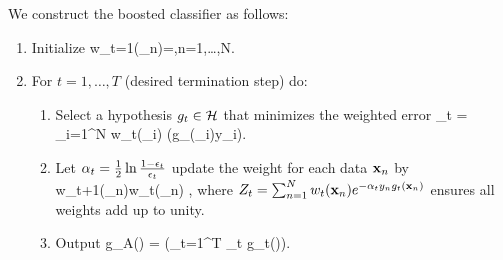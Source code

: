 We construct the boosted classifier as follows:
\begin{enumerate}
	\item Initialize
	\bse 
	w_{t=1}(\mx_n)=,\quad n=1,\dots,N.
	\ese 
	\item For $t=1,\dots, T$ (desired termination step) do:
	\begin{enumerate}
		\item Select a hypothesis $g_t \in \mathcal{H}$ that minimizes the weighted error 
		\be
		\epsilon_t = \sum_{i=1}^N w_t(\mx_i) \mI(g_(\mx_i)\neq y_i).
		\ee 
		\item Let $\alpha_t = \frac{1}{2} \ln \frac{1-\epsilon_t}{\epsilon_t}$ update the weight for each data $\mathbf{x}_n$ by 
		\bse 
		w_{t+1}(\mx_n)\leftarrow w_t(\mx_n) ,
		\ese 
		where $Z_t=\sum_{n=1}^N w_t(\mathbf{x}_n) e^{-\alpha_t y_n g_t(\mathbf{x}_n)}$ ensures all weights add up to unity.
		\item Output
	\bse 
	g_A(\mx) = \left(\sum_{t=1}^T \alpha_t g_t(\mx)\right).
	\ese 
	\end{enumerate}
\end{enumerate}
